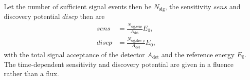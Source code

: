 Let the number of sufficient signal events then be $N_\text{sig}$, the sensitivity $sens$ and discovery potential $disc p$ then are
\begin{align}
  sens &= \frac{N_\text{sig,sens}}{A_\text{det}}E_0, \label{eq:sens}\\
  disc p &= \frac{N_\text{sig,disc p}}{A_\text{det}}E_0, \label{eq:disc}
\end{align}
with the total signal acceptance of the detector $A_\text{det}$ and the reference energy $E_0$.
The time-dependent sensitivity and discovery potential are given in a fluence rather than a flux.%
